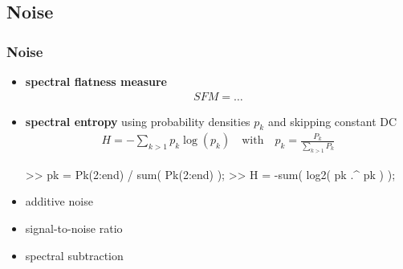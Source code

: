 
\subsection{Noise}

\begin{frame}[fragile] %
	\frametitle{Noise}
	\begin{itemize}
		\item \textbf{spectral flatness measure}
			\begin{align*}
				\mathit{SFM}=\ldots
			\end{align*}
		\item \textbf{spectral entropy} using probability densities $p_k$ and skipping constant DC
			\begin{align*}
				H=-\sum_{k>1}p_k\log(p_k)\quad\textrm{with}\quad p_k=\frac{P_k}{\sum_{k>1}P_k}
			\end{align*}
			\begin{code}
>> pk = Pk(2:end) / sum( Pk(2:end) ); \color{medium}%
>> H = -sum( log2( pk .^ pk ) ); \color{medium}%
			\end{code}
		\item additive noise
		\item signal-to-noise ratio
		\item spectral subtraction
	\end{itemize}
\end{frame}

